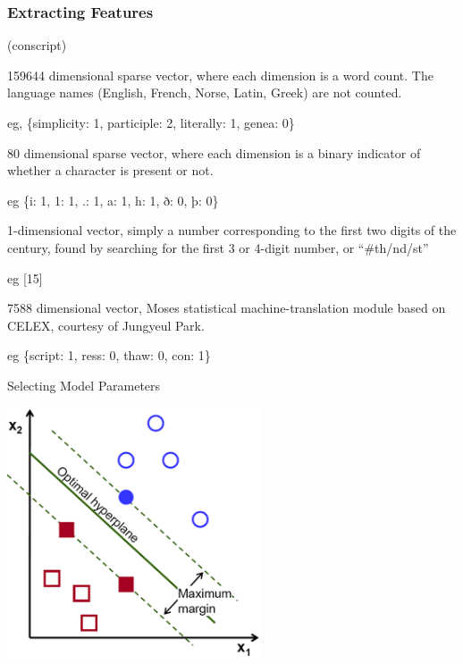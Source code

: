 \documentclass[10pt]{beamer}
\begin{document}
\begin{frame}[fragile]
  \frametitle{Extracting Features}

(conscript)

\pause

\begin{description}[<+->]
  \item[Bag-of-Words] 159644 dimensional sparse vector, where each dimension is a word count. The language names (English, French, Norse, Latin, Greek) are not counted.

  eg, \{simplicity: 1, participle: 2, literally: 1, genea: 0\}

  \item[Characters] 80 dimensional sparse vector, where each dimension is a binary indicator of whether a character is present or not.

  eg \{i: 1, 1: 1, .: 1, a: 1, h: 1, ð: 0, þ: 0\}

  \item[Century] 1-dimensional vector, simply a number corresponding to the first two digits of the century, found by searching for the first 3 or 4-digit number, or ``#th/nd/st''

  eg [15]

  \item[Syllable] 7588 dimensional vector, Moses statistical machine-translation module based on CELEX, courtesy of Jungyeul Park.

  eg \{script: 1, ress: 0, thaw: 0, con: 1\}
\end{description}

\end{frame}








\begin{frame}[fragile]{Selecting Model Parameters}

    \centerline{\includegraphics[width=7.5cm]{svmillustration.png}}


\end{frame}
\end{document}
